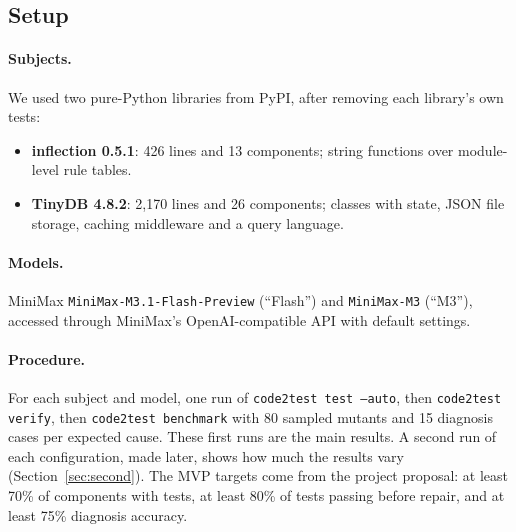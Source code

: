 \documentclass[11pt]{article}
\newcommand{\code}[1]{\texttt{#1}}
\begin{document}
\subsection{Setup}
\paragraph{Subjects.}
We used two pure-Python libraries from PyPI, after removing each library's own tests:
\begin{itemize}
  \item \textbf{inflection 0.5.1}: 426 lines and 13 components; string functions over module-level rule tables.
  \item \textbf{TinyDB 4.8.2}: 2{,}170 lines and 26 components; classes with state, JSON file storage, caching middleware and a query language.
\end{itemize}

\paragraph{Models.}
MiniMax \code{MiniMax-M3.1-Flash-Preview} (``Flash'') and \code{MiniMax-M3} (``M3''), accessed through MiniMax's OpenAI-compatible API with default settings.

\paragraph{Procedure.}
For each subject and model, one run of \code{code2test test --auto}, then \code{code2test verify}, then \code{code2test benchmark} with 80 sampled mutants and 15 diagnosis cases per expected cause.
These first runs are the main results.
A second run of each configuration, made later, shows how much the results vary (Section~\ref{sec:second}).
The MVP targets come from the project proposal: at least 70\% of components with tests, at least 80\% of tests passing before repair, and at least 75\% diagnosis accuracy.
\end{document}
